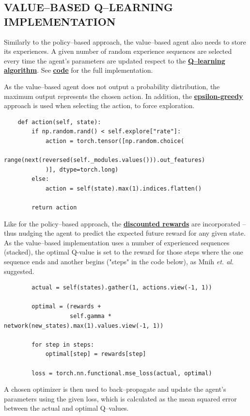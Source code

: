 \documentclass{article}
\let\oldhyperlink\hyperlink
\renewcommand{\hyperlink}[2]{\oldhyperlink{#1}{\textbf{#2}}}
\let\oldcite\cite
\renewcommand{\cite}[1]{\textbf{\oldcite{#1}}}
\renewenvironment{leftbar}[1][\hsize]{
    \def\FrameCommand{{\color{barcolor}\vrule width 0.5pt \hspace{10pt}}}
    \MakeFramed{\hsize#1 \advance\hsize-\width \FrameRestore}
}{\endMakeFramed}
\begin{document}
\subsection*{\normalsize VALUE–BASED Q–LEARNING IMPLEMENTATION}
\begin{leftbar}

    Similarly to the policy–based approach, the value–based agent also needs to store its experiences. A given number of random experience sequences are selected every time the agent's parameters are updated respect to the \hyperlink{sec:value-based-approach}{Q–learning algorithm}. See \hyperlink{sec:code}{code} for the full implementation.

    As the value–based agent does not output a probability distribution, the maximum output represents the chosen action. In addition, the \hyperlink{eq:epsilon-greedy}{epsilon-greedy} approach is used when selecting the action, to force exploration.

    \begin{lstlisting}
    def action(self, state):
        if np.random.rand() < self.explore["rate"]:
            action = torch.tensor([np.random.choice(
                range(next(reversed(self._modules.values())).out_features)
            )], dtype=torch.long)
        else:
            action = self(state).max(1).indices.flatten()

        return action
    \end{lstlisting}

    Like for the policy–based approach, the \hyperlink{code:reward}{discounted rewards} are incorporated – thus nudging the agent to predict the expected future reward for any given state. As the value–based implementation uses a number of experienced sequences (stacked), the optimal Q-value is set to the reward for those steps where the one sequence ends and another begins ("steps" in the code below), as Mnih \textit{et. al.} \cite{Human-level} suggested.

    \begin{lstlisting}
        actual = self(states).gather(1, actions.view(-1, 1))

        optimal = (rewards +
                   self.gamma * network(new_states).max(1).values.view(-1, 1))

        for step in steps:
            optimal[step] = rewards[step]

        loss = torch.nn.functional.mse_loss(actual, optimal)
    \end{lstlisting}

    A chosen optimizer is then used to back–propagate and update the agent's parameters using the given loss, which is calculated as the mean squared error between the actual and optimal Q–values. \cite{Q-deep}
\end{leftbar}
\end{document}
